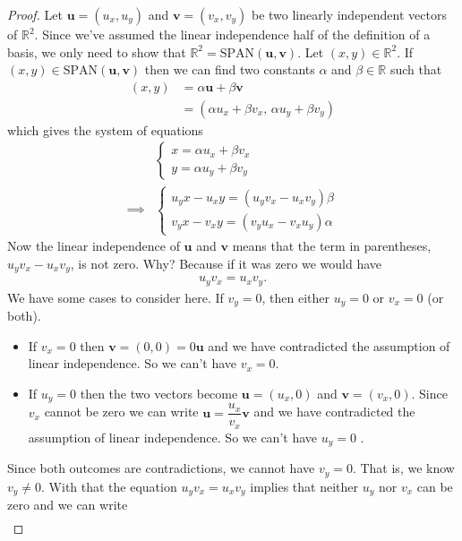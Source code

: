 \begin{proof}
Let $\mathbf{u}=(u_x,u_y)$ and $\mathbf{v}=(v_x,v_y)$ be two linearly independent vectors of $\mathbb{R}^2$. Since we've assumed the linear independence half of the definition of a basis, we only need to show that $\mathbb{R}^2 = \text{SPAN}(\mathbf{u},\mathbf{v})$. Let $(x,y)\in \mathbb{R}^2$. If $(x,y) \in \text{SPAN}(\mathbf{u},\mathbf{v})$ then we can find two constants $\alpha$ and $\beta \in \mathbb{R}$ such that
\begin{align*}
(x,y) &= \alpha \mathbf{u} + \beta \mathbf{v} \\
&= (\alpha u_x + \beta v_x, \,\alpha u_y + \beta v_y )
\end{align*}
which gives the system of equations
\begin{align*}
&
\begin{cases}
x = \alpha u_x + \beta v_x \\
y = \alpha u_y+ \beta v_y
\end{cases}
\\
\implies &
\begin{cases} 
u_y x - u_x y = (u_y  v_x  - u_x v_y) \beta \\
v_y x - v_x y = (v_y  u_x  - v_x u_y) \alpha
\end{cases}
\end{align*}
Now the linear independence of $\mathbf{u}$ and $\mathbf{v}$ means that the term in parentheses, $u_y  v_x  - u_x v_y$, is not zero. Why? Because if it was zero we would have
\begin{align*}
u_y  v_x = u_x v_y.
\end{align*}
We have some cases to consider here. If $v_y=0$, then either $u_y=0$ or $v_x=0$ (or both). 
\begin{itemize}
	\item If $v_x = 0$ then $\mathbf{v}=(0,0)=0\mathbf{u}$ and we have contradicted the assumption of linear independence. So we can't have $v_x = 0$.
	\item If $u_y=0$ then the two vectors become $\mathbf{u}=(u_x,0)$ and $\mathbf{v}=(v_x,0)$. Since $v_x$ cannot be zero we can write $\mathbf{u}=\dfrac{u_x}{v_x}\mathbf{v}$ and we have contradicted the assumption of linear independence. So we can't have $u_y=0$ . 
\end{itemize}
Since both outcomes are contradictions, we cannot have $v_y=0$. That is, we know $v_y\neq 0$. With that the equation $u_y  v_x = u_x v_y$ implies that neither $u_y$ nor $v_x$ can be zero and we can write
\begin{align*}

\end{align*}
\end{proof}
